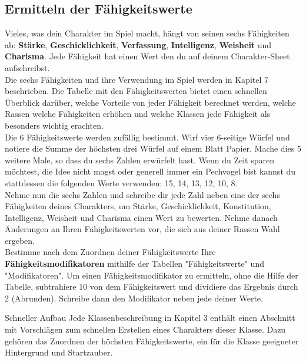 \subsection{Ermitteln der Fähigkeitswerte}
Vieles, was dein Charakter im Spiel macht, hängt von seinen sechs Fähigkeiten ab:
\textbf{Stärke}, \textbf{Geschicklichkeit}, \textbf{Verfassung}, \textbf{Intelligenz}, \textbf{Weisheit} und \textbf{Charisma}. Jede Fähigkeit hat einen Wert den du	auf deinem Charakter-Sheet aufschreibst. \\
Die sechs Fähigkeiten und ihre Verwendung im Spiel werden in Kapitel 7 beschrieben. Die Tabelle mit den Fähigkeitswerten bietet einen schnellen Überblick darüber, welche Vorteile von jeder Fähigkeit berechnet werden, welche Rassen welche Fähigkeiten erhöhen und welche Klassen jede Fähigkeit als besonders wichtig erachten.\\
Die 6 Fähigkeitswerte werden zufällig bestimmt. Wirf vier 6-seitige Würfel und notiere die Summe der höchsten drei Würfel auf einem Blatt Papier.
Mache dies 5 weitere Male, so dass du sechs Zahlen erwürfelt hast. Wenn du Zeit sparen möchtest, die Idee nicht magst oder generell immer ein Pechvogel bist kannst du stattdessen die folgenden Werte verwenden: 15, 14, 13, 12, 10, 8.\\
Nehme nun die sechs Zahlen und schreibe dir jede Zahl neben eine der sechs Fähigkeiten deines Charakters, um Stärke, Geschicklichkeit, Konstitution, Intelligenz, Weisheit und Charisma einen Wert zu bewerten. Nehme danach Änderungen an Ihren Fähigkeitswerten vor, die sich aus deiner Rassen Wahl ergeben.\\
Bestimme nach dem Zuordnen deiner Fähigkeitswerte Ihre \textbf{Fähigkeitsmodifikatoren} mithilfe der Tabellen "Fähigkeitswerte" und "Modifikatoren". Um einen Fähigkeitsmodifikator zu ermitteln, ohne die Hilfe der Tabelle, subtrahiere 10 von dem Fähigkeitswert und dividiere das Ergebnis durch 2 (Abrunden). Schreibe dann den Modifikator neben jede deiner Werte.
\newpage
\begin{commentbox}{Schneller Aufbau}
Jede Klassenbeschreibung in Kapitel 3 enthält einen Abschnitt mit Vorschlägen zum schnellen Erstellen eines Charakters dieser Klasse. Dazu gehören das Zuordnen der höchsten Fähigkeitswerte, ein für die Klasse geeigneter Hintergrund und Startzauber.
\end{commentbox}


